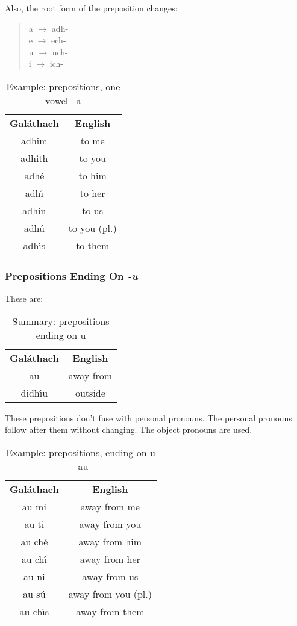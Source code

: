 Also, the root form of the preposition changes:
\begin{quote}
a $\rightarrow$ adh-\\
e $\rightarrow$ ech-\\
u $\rightarrow$ uch-\\
i $\rightarrow$ ich-
\end{quote}

\begin{table}[H]
\centering
\begin{tabular}{cc}
  \toprule
  \textbf{Gal\'{a}thach} & \textbf{English}\\
  \cmidrule(lr){1-1}\cmidrule(lr){2-2}
  adhim & to me\\
  adhith & to you\\
  adh\'{e} & to him\\
  adh\'{\i} & to her\\
  adhin & to us\\
  adh\'{u} & to you (pl.)\\
  adh\'{\i}s & to them\\
  \bottomrule
\end{tabular}
\caption{Example: prepositions, one vowel \textendash\ a}
\label{example_prepositions_one_vowel_a}
\end{table}

\subsubsection{Prepositions Ending On \textit{-u}}
These are:
\begin{table}[H]
\centering
\begin{tabular}{cc}
  \toprule
  \textbf{Gal\'{a}thach} & \textbf{English}\\
  \cmidrule(lr){1-1}\cmidrule(lr){2-2}
  au & away from\\
  didh\'{\i}u & outside\\
  \bottomrule
\end{tabular}
\caption{Summary: prepositions ending on u}
\label{summary_prepositions_ending_on_u}
\end{table}

These prepositions don't fuse with personal pronouns. The personal pronouns follow after them without changing. The object pronouns are used.
\begin{table}[H]
\centering
\begin{tabular}{cc}
  \toprule
  \textbf{Gal\'{a}thach} & \textbf{English}\\
  \cmidrule(lr){1-1}\cmidrule(lr){2-2}
  au mi & away from me\\
  au ti & away from you\\
  au ch\'{e} & away from him\\
  au ch\'{\i} & away from her\\
  au ni & away from us\\
  au s\'{u} & away from you (pl.)\\
  au ch\'{\i}s & away from them\\
  \bottomrule
\end{tabular}
\caption{Example: prepositions, ending on u \textendash\ au}
\label{example_prepositions_ending_on_u_au}
\end{table}

